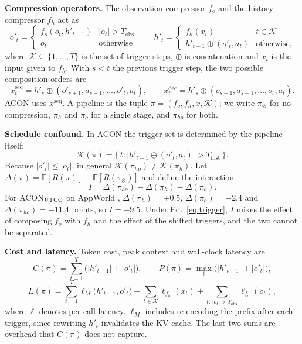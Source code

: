 \documentclass[10pt,a4paper]{article}
\begin{document}
\textbf{Compression operators.} The observation compressor $f_o$ and the
history compressor $f_h$ act as
\begin{equation}
o'_t=\begin{cases} f_o(o_t,h'_{t-1}) & |o_t|>T_{\mathrm{obs}}\\ o_t & \text{otherwise}\end{cases}
\qquad
h'_t=\begin{cases} f_h(x_t) & t\in\mathcal{K}\\ h'_{t-1}\oplus(o'_t,a_t) & \text{otherwise},\end{cases}
\label{eq:ops}
\end{equation}
where $\mathcal{K}\subseteq\{1,\dots,T\}$ is the set of trigger steps,
$\oplus$ is concatenation and $x_t$ is the input given to $f_h$. With $s<t$ the
previous trigger step, the two possible composition orders are
\begin{equation}
x_t^{\mathrm{seq}} = h'_s\oplus(o'_{s+1},a_{s+1},\dots,o'_t,a_t),
\qquad
x_t^{\mathrm{dec}} = h'_s\oplus(o_{s+1},a_{s+1},\dots,o_t,a_t).
\label{eq:order}
\end{equation}
ACON uses $x^{\mathrm{seq}}$. A pipeline is the tuple
$\pi=(f_o,f_h,x,\mathcal{K})$; we write $\pi_\varnothing$ for no compression,
$\pi_h$ and $\pi_o$ for a single stage, and $\pi_{ho}$ for both.

\textbf{Schedule confound.} In ACON the trigger set is determined by the
pipeline itself:
\begin{equation}
\mathcal{K}(\pi)=\big\{\,t : |h'_{t-1}\oplus(o'_t,a_t)|>T_{\mathrm{hist}}\,\big\}.
\label{eq:trigger}
\end{equation}
Because $|o'_t|\le|o_t|$, in general $\mathcal{K}(\pi_{ho})\neq\mathcal{K}(\pi_h)$.
Let $\Delta(\pi)=\mathbb{E}[R(\pi)]-\mathbb{E}[R(\pi_\varnothing)]$ and define
the interaction
\begin{equation}
I=\Delta(\pi_{ho})-\Delta(\pi_h)-\Delta(\pi_o).
\label{eq:interaction}
\end{equation}
For ACON$_{\textsc{UTCO}}$ on AppWorld \cite{ACON},
$\Delta(\pi_h)=+0.5$, $\Delta(\pi_o)=-2.4$ and $\Delta(\pi_{ho})=-11.4$
points, so $I=-9.5$. Under Eq.~\eqref{eq:trigger}, $I$ mixes the effect of
composing $f_o$ with $f_h$ and the effect of the shifted triggers, and the two
cannot be separated.

\textbf{Cost and latency.} Token cost, peak context and wall-clock latency are
\begin{equation}
C(\pi)=\sum_{t=1}^{T}\big(|h'_{t-1}|+|o'_t|\big),\qquad
P(\pi)=\max_{t}\big(|h'_{t-1}|+|o'_t|\big),
\label{eq:cost}
\end{equation}
\begin{equation}
L(\pi)=\sum_{t=1}^{T}\ell_M\big(h'_{t-1},o'_t\big)
+\sum_{t\in\mathcal{K}}\ell_{f_h}(x_t)
+\sum_{t:\,|o_t|>T_{\mathrm{obs}}}\ell_{f_o}(o_t),
\label{eq:latency}
\end{equation}
where $\ell$ denotes per-call latency. $\ell_M$ includes re-encoding the prefix
after each trigger, since rewriting $h'_t$ invalidates the KV cache. The last
two sums are overhead that $C(\pi)$ does not capture.
\end{document}
